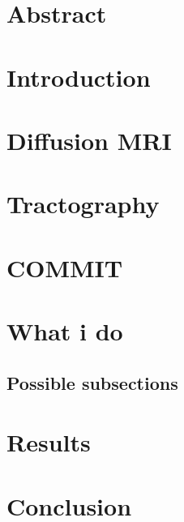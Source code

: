\documentclass[a4paper,12pt,titlepage]{book}
\begin{document}
\preparefrontpagestandard
\begin{otherlanguage}{english}

\tableofcontents 
\chapter {Abstract}

\chapter {Introduction}



\chapter {Diffusion MRI}
\chapter {Tractography}
\chapter {COMMIT}

\chapter {What i do}
\section {Possible subsections}

\chapter {Results}

\chapter {Conclusion}

\end{otherlanguage}
\end{document}
